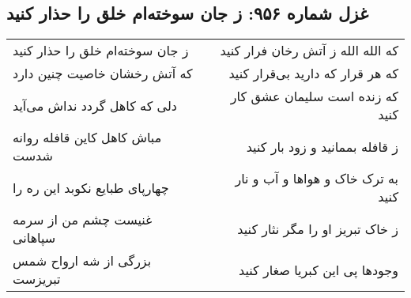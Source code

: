 \begin{center}
\section*{غزل شماره ۹۵۶: ز جان سوخته‌ام خلق را حذار کنید}
\label{sec:0956}
\begin{longtable}{l p{0.5cm} r}
ز جان سوخته‌ام خلق را حذار کنید
&&
که الله الله ز آتش رخان فرار کنید
\\
که آتش رخشان خاصیت چنین دارد
&&
که هر قرار که دارید بی‌قرار کنید
\\
دلی که کاهل گردد نداش می‌آید
&&
که زنده است سلیمان عشق کار کنید
\\
مباش کاهل کاین قافله روانه شدست
&&
ز قافله بممانید و زود بار کنید
\\
چهارپای طبایع نکوبد این ره را
&&
به ترک خاک و هواها و آب و نار کنید
\\
غنیست چشم من از سرمه سپاهانی
&&
ز خاک تبریز او را مگر نثار کنید
\\
بزرگی از شه ارواح شمس تبریزست
&&
وجودها پی این کبریا صغار کنید
\\
\end{longtable}
\end{center}
